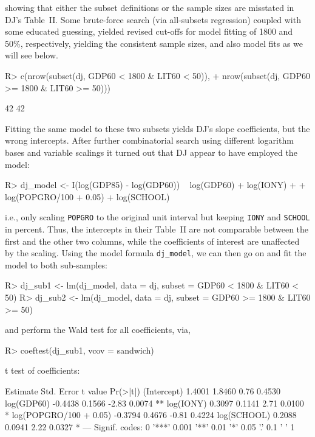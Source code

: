 \documentclass[10pt,a4paper,twoside]{article}
\let\code=\texttt
\newenvironment{Schunk}{}{}
\begin{document}
showing that either the subset definitions or the sample sizes are misstated in DJ's Table~II.
Some brute-force search (via all-subsets regression) coupled with some educated guessing, yielded revised 
cut-offs for model fitting of 1800 and 50\%,
respectively, yielding the consistent sample sizes, 
and also model fits as we will see below.

\begin{Schunk}
\begin{Sinput}
R> c(nrow(subset(dj, GDP60 <  1800 & LIT60 <  50)),
+    nrow(subset(dj, GDP60 >= 1800 & LIT60 >= 50)))
\end{Sinput}
\begin{Soutput}
[1] 42 42
\end{Soutput}
\end{Schunk}

Fitting the same model to these two subsets yields DJ's slope
coefficients, but the wrong intercepts. After further combinatorial search
using different logarithm bases and variable scalings it turned out that DJ 
appear to have employed the model: 

\begin{Schunk}
\begin{Sinput}
R> dj_model <- I(log(GDP85) - log(GDP60)) ~ log(GDP60) + log(IONY) +
+    log(POPGRO/100 + 0.05) + log(SCHOOL)
\end{Sinput}
\end{Schunk}

i.e., only scaling \code{POPGRO} to the original unit interval but keeping \code{IONY}
and \code{SCHOOL} in percent. Thus, the intercepts in their Table~II are not comparable
between the first and the other two columns, while the coefficients of interest are
unaffected by the scaling. Using the model formula \code{dj\_model}, we can then go on
and fit the model to both sub-samples:

\begin{Schunk}
\begin{Sinput}
R> dj_sub1 <- lm(dj_model, data = dj, subset = GDP60 <  1800 & LIT60 <  50)
R> dj_sub2 <- lm(dj_model, data = dj, subset = GDP60 >= 1800 & LIT60 >= 50)
\end{Sinput}
\end{Schunk}

and perform the Wald test for all coefficients, via,

\begin{Schunk}
\begin{Sinput}
R> coeftest(dj_sub1, vcov = sandwich)
\end{Sinput}
\begin{Soutput}
t test of coefficients:

                       Estimate Std. Error t value Pr(>|t|)   
(Intercept)              1.4001     1.8460    0.76   0.4530   
log(GDP60)              -0.4438     0.1566   -2.83   0.0074 **
log(IONY)                0.3097     0.1141    2.71   0.0100 * 
log(POPGRO/100 + 0.05)  -0.3794     0.4676   -0.81   0.4224   
log(SCHOOL)              0.2088     0.0941    2.22   0.0327 * 
---
Signif. codes:  0 '***' 0.001 '**' 0.01 '*' 0.05 '.' 0.1 ' ' 1 
\end{Soutput}
\end{Schunk}
\end{document}
